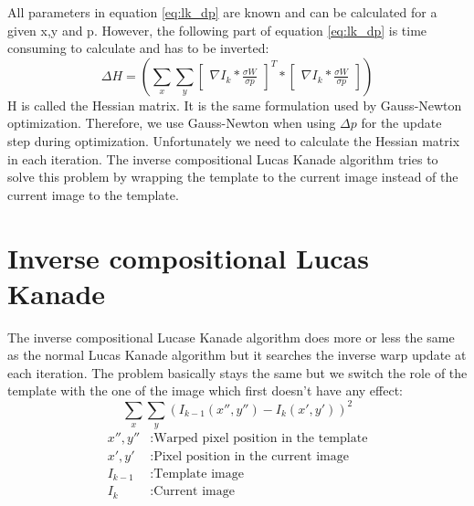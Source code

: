 \documentclass[11pt,a4paper,titlepage,oneside]{report}
\begin{document}
All parameters in equation \ref{eq:lk_dp} are known and can be calculated for a given x,y and p. However, the following part of equation \ref{eq:lk_dp} is time consuming to calculate and has to be inverted:
\begin{equation}
  \Delta H=(\sum_x\sum_y\begin{bmatrix}\nabla I_{k}*\frac{\sigma W}{\sigma p}\end{bmatrix}^T*\begin{bmatrix}\nabla I_{k}*\frac{\sigma W}{\sigma p}\end{bmatrix})
\end{equation}
H is called the Hessian matrix. It is the same formulation used by Gauss-Newton optimization. Therefore, we use Gauss-Newton when using $\Delta p$ for the update step \cite{inverse_compositional} during optimization. Unfortunately we need to calculate the Hessian matrix in each iteration. The inverse compositional Lucas Kanade algorithm tries to solve this problem by wrapping the template to the current image instead of the current image to the template.

\section{Inverse compositional Lucas Kanade}

The inverse compositional Lucase Kanade algorithm does more or less the same as the normal Lucas Kanade algorithm but it searches the inverse warp update at each iteration. The problem basically stays the same but we switch the role of the template with the one of the image which first doesn't have any effect:
\begin{equation}\label{eq:iclk_problem}
  \sum_x\sum_y(I_{k-1}(x'',y'')-I_{k}(x',y'))^2
\end{equation}
\begin{align*}
  x'',y''    &:  \text{Warped pixel position in the template}\\
  x',y'      &:  \text{Pixel position in the current image}\\
  I_{k-1}    &:  \text{Template image}\\
  I_{k}      &:  \text{Current image}
\end{align*}
\end{document}

